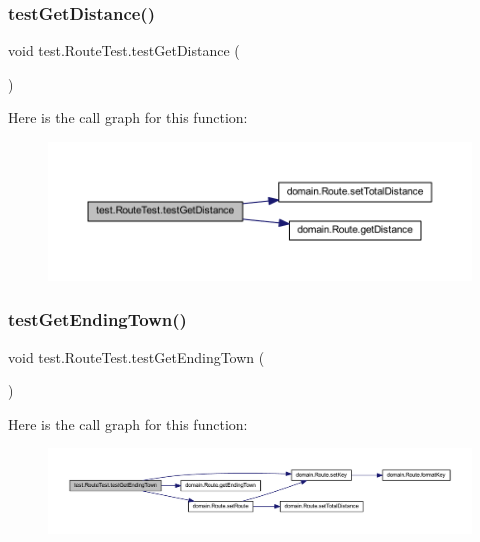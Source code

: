 \subsubsection{\texorpdfstring{test\+Get\+Distance()}{testGetDistance()}}
{\footnotesize\ttfamily void test.\+Route\+Test.\+test\+Get\+Distance (\begin{DoxyParamCaption}{ }\end{DoxyParamCaption})}

Here is the call graph for this function\+:\nopagebreak
\begin{figure}[H]
\begin{center}
\leavevmode
\includegraphics[width=350pt]{classtest_1_1_route_test_af066f97eb9ba4d89e2c3305da7160a2b_cgraph}
\end{center}
\end{figure}
\mbox{\label{classtest_1_1_route_test_a892b2d6667e4202a15746f84018d2efb}} 
\subsubsection{\texorpdfstring{test\+Get\+Ending\+Town()}{testGetEndingTown()}}
{\footnotesize\ttfamily void test.\+Route\+Test.\+test\+Get\+Ending\+Town (\begin{DoxyParamCaption}{ }\end{DoxyParamCaption})}

Here is the call graph for this function\+:\nopagebreak
\begin{figure}[H]
\begin{center}
\leavevmode
\includegraphics[width=350pt]{classtest_1_1_route_test_a892b2d6667e4202a15746f84018d2efb_cgraph}
\end{center}
\end{figure}
\mbox{\label{classtest_1_1_route_test_ae5d74fb8dedad7c5ee9d7aa1f6e181ca}} 
